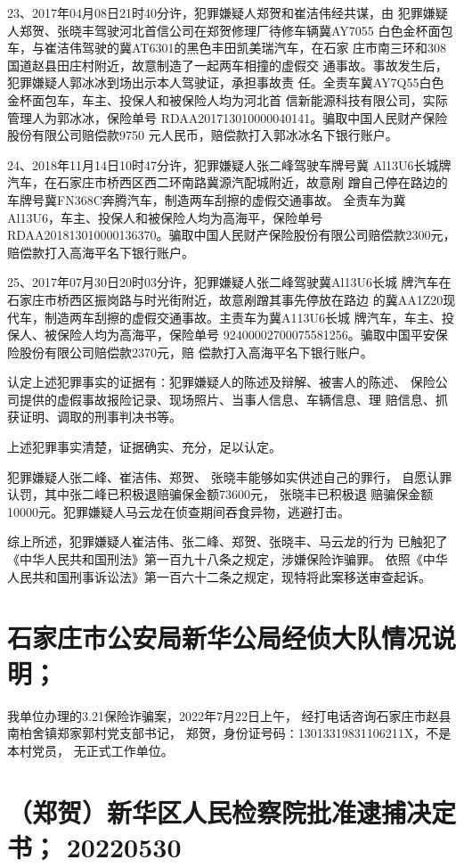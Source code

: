 23、2017年04月08日21时40分许，犯罪嫌疑人郑贺和崔洁伟经共谋，由
犯罪嫌疑人郑贺、张晓丰驾驶河北首信公司在郑贺修理厂待修车辆冀AY7055
白色金杯面包车，与崔洁伟驾驶的冀AT6301的黑色丰田凯美瑞汽车，在石家
庄市南三环和308国道赵县田庄村附近，故意制造了一起两车相撞的虚假交
通事故。事故发生后，犯罪嫌疑人郭冰冰到场出示本人驾驶证，承担事故责
任。全责车冀AY7Q55白色金杯面包车，车主、投保人和被保险人均为河北首
信新能源科技有限公司，实际管理人为郭冰冰，保险单号
RDAA201713010000040141。骗取中国人民财产保险股份有限公司赔偿款9750
元人民币，赔偿款打入郭冰冰名下银行账户。

24、2018年11月14日10时47分许，犯罪嫌疑人张二峰驾驶车牌号冀
Al13U6长城牌汽车，在石家庄市桥西区西二环南路冀源汽配城附近，故意剐
蹭自己停在路边的车牌号冀FN368C奔腾汽车，制造两车刮擦的虚假交通事故。
全责车为冀Al13U6，车主、投保人和被保险人均为高海平，保险单号
RDAA201813010000136370。骗取中国人民财产保险股份有限公司赔偿款2300元，赔偿款打入高海平名下银行账户。

25、2017年07月30日20时03分许，犯罪嫌疑人张二峰驾驶冀Al13U6长城
牌汽车在石家庄市桥西区振岗路与时光街附近，故意剐蹭其事先停放在路边
的冀AA1Z20现代车，制造两车刮擦的虚假交通事故。主责车为冀A113U6长城
牌汽车，车主、投保人、被保险人均为高海平，保险单号
92400002700075581256。骗取中国平安保险股份有限公司赔偿款2370元，赔
偿款打入高海平名下银行账户。

认定上述犯罪事实的证据有∶犯罪嫌疑人的陈述及辩解、被害人的陈述、
保险公司提供的虚假事故报险记录、现场照片、当事人信息、车辆信息、理
赔信息、抓获证明、调取的刑事判决书等。

上述犯罪事实清楚，证据确实、充分，足以认定。

犯罪嫌疑人张二峰、崔洁伟、郑贺、 张晓丰能够如实供述自己的罪行，
自愿认罪认罚，其中张二峰已积极退赔骗保金额73600元， 张晓丰已积极退
赔骗保金额10000元。犯罪嫌疑人马云龙在侦查期间吞食异物，逃避打击。

综上所述，犯罪嫌疑人崔洁伟、张二峰、郑贺、张晓丰、马云龙的行为
已触犯了《中华人民共和国刑法》第一百九十八条之规定，涉嫌保险诈骗罪。
依照《中华人民共和国刑事诉讼法》第一百六十二条之规定，现特将此案移送审查起诉。

\section{
    石家庄市公安局新华公局经侦大队情况说明；
}
我单位办理的3.21保险诈骗案，2022年7月22日上午，
经打电话咨询石家庄市赵县南柏舍镇郑家郭村党支部书记，
郑贺，身份证号码∶13013319831106211X，不是本村党员，
无正式工作单位。

\section{
    （郑贺）新华区人民检察院批准逮捕决定书；
    20220530
}
